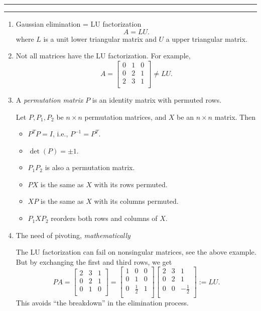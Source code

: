 \documentclass[11pt]{article}
\begin{document}
\hrule
\bigskip 
{}
\bigskip 
\hrule

\begin{enumerate}
\item Gaussian elimination = LU factorization 
      $$A = LU.$$ 
      where $L$ is a unit lower triangular matrix and $U$ a upper 
      triangular matrix. 

\item Not all matrices have the LU factorization. For example,  
$$
A = \left[ \begin{array}{ccc}
            0 & 1 & 0 \\
            0 & 2 & 1 \\
            2 & 3 & 1 \\
           \end{array} \right] \neq LU.
$$

\item A {\em permutation matrix} $P$ is an identity matrix with permuted rows.

Let $P, P_1, P_2$ be $n\times n$ permutation matrices, 
and $X$ be an $n \times n$ matrix. Then
\begin{itemize}
\item $P^{T} P  = I$, i.e., $P^{-1} = P^T$.
\item $\det(P) = \pm 1$.
\item $P_1P_2$ is also a permutation matrix.
\item $PX$ is the same as $X$ with its rows permuted.
\item $XP$ is the same as $X$ with its columns permuted.
\item $P_1 XP_2 $ reorders both rows and columns of $X$.
\end{itemize}

\item The need of pivoting, {\em mathematically}

The LU factorization can fail on nonsingular matrices, see the 
above example. But by exchanging the first and third rows, we get
$$
P A = \left[ \begin{array}{ccc}
            2 & 3 & 1  \\
            0 & 2 & 1 \\
            0 & 1 & 0  \\
           \end{array} \right]
=  \left[ \begin{array}{ccc}
            1 & 0 & 0  \\
            0 & 1 & 0 \\
            0 & \frac12 & 1  \\
           \end{array} \right]
    \left[ \begin{array}{ccc}
            2 & 3 & 1  \\
            0 & 2 & 1 \\
            0 & 0 & -\frac12  \\
           \end{array} \right] := L U. 
$$
This avoids ``the breakdown'' in the elimination process. 


\end{enumerate}
\end{document}
